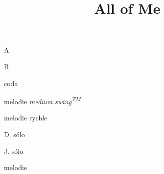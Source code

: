 \documentclass[timestamp]{jazzgrid}
\title{All of Me}
\begin{document}
\maketitle
\begin{musicsection}{A}
\barline
	{\barfour{}
		{}
		{}
		{}
		{}
	}
	{\barfour{}
		{}
		{}
		{}
		{}
	}
	{\barfour{}
		{}
		{}
		{}
		{}
	}
	{\barfour{}
		{}
		{}
		{}
		{}
	}
\barline
	{\barfour{}
		{}
		{}
		{}
		{}
	}
	{\barfour{}
		{}
		{}
		{}
		{}
	}
	{\barfour{}
		{}
		{}
		{}
		{}
	}
	{\barfour{}
		{}
		{}
		{}
		{}
	}
\barline
	{\barfour{}
		{}
		{}
		{}
		{}
	}
	{\barfour{}
		{}
		{}
		{}
		{}
	}
	{\barfour{}
		{}
		{}
		{}
		{}
	}
	{\barfour{}
		{}
		{}
		{}
		{}
	}
\barline
	{\barfour{}
		{}
		{}
		{}
		{}
	}
	{\barfour{}
		{}
		{}
		{}
		{}
	}
	{\barfour{}
		{}
		{}
		{}
		{}
	}
	{\barfour{}
		{}
		{}
		{}
		{}
	}
\end{musicsection}

\begin{musicsection}{B}
\barline
	{\barfour{}
		{}
		{}
		{}
		{}
	}
	{\barfour{}
		{}
		{}
		{}
		{}
	}
	{\barfour{}
		{}
		{}
		{}
		{}
	}
	{\barfour{}
		{}
		{}
		{}
		{}
	}
\barline
	{\barfour{}
		{}
		{}
		{}
		{}
	}
	{\barfour{}
		{}
		{}
		{}
		{}
	}
	{\barfour{}
		{}
		{}
		{}
		{}
	}
	{\barfour{}
		{}
		{}
		{}
		{}
	}
\barline
	{\barfour{}
		{}
		{}
		{}
		{}
	}
	{\barfour{}
		{}
		{}
		{}
		{}
	}
	{\barfour{}
		{}
		{}
		{}
		{}
	}
	{\barfour{}
		{}
		{}
		{}
		{}
	}
\barline
	{
		{}
		{}
		{}
		{}
	}
	{\barfour{}
		{}
		{}
		{}
		{}
	}
	{\barfour{}
		{}
		{}
		{}
		{}
	}
	{\barfour{}
		{}
		{}
		{}
		{}
	}
\end{musicsection}

\begin{musicsection}{coda}
\barline
	{\barfour{}
		{}
		{}
		{}
		{}
	}
	{\barfour{}
		{}
		{}
		{}
		{}
	}
	{\barfour{}
		{}
		{}
		{}
		{}
	}
	{\barfour{}
		{}
		{}
		{}
		{}
	}
	{\barfour{}
		{}
		{}
		{}
		{}
	}
	{\barfour{}
		{}
		{}
		{}
		{}
	}
	{\barfour{}
		{}
		{}
		{}
		{}
	}
\end{musicsection}


\begin{multicols*}{2}
\begin{description}[noitemsep,align=right,labelwidth=48pt]
	\scriptsize
	\item [AB] melodie \emph{medium swing\textsuperscript{TM}}
	\item [AB] melodie rychle
	\item [AB] D. sólo
	\item [ABAB] J. sólo
	\item [AB] melodie
\end{description}

\end{multicols*}
\end{document}
